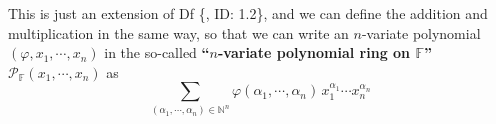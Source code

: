\documentclass{article}
\begin{document}
\begin{Rmk}{}
    \textcolor{Th}{This is just an extension of Df \{, ID: 1.2\},} \textcolor{Df}{and we can define the addition and multiplication in the same way, so that we can write an $n$-variate polynomial $(\varphi, x_1, \cdots, x_n)$ in the so-called \textbf{``$n$-variate polynomial ring on $\mathbb{F}$''} $\mathcal{P}_\mathbb{F}(x_1,\cdots, x_n)$ as
    $$\sum_{(\alpha_1, \cdots, \alpha_n)\in\mathbb{N}^n}\varphi(\alpha_1, \cdots, \alpha_n)\, x_1^{\alpha_1}\cdots x_n^{\alpha_n}$$}
\end{Rmk}
\end{document}
